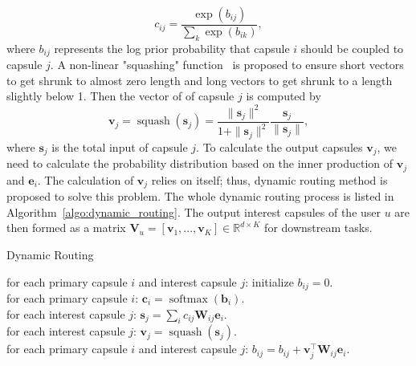 \begin{equation}
    c_{ij}=\frac{\exp(b_{ij})}{\sum_k \exp(b_{ik})},
\end{equation}
where $b_{ij}$ represents the log prior probability that capsule $i$ should be coupled to capsule $j$. A non-linear "squashing" function~\cite{sabour2017dynamic} is proposed to ensure short vectors to get shrunk to almost zero length and long vectors to get shrunk to a length slightly below 1. Then the vector of of capsule $j$ is computed by
\begin{equation}
    \label{eqn:squash}
    \mathbf{v}_j = \operatorname{squash}(\mathbf{s}_j) =  \frac{\|\mathbf{s}_j\|^2}{1+\|\mathbf{s}_j\|^2} \frac{\mathbf{s}_j}{\|\mathbf{s}_j\|},
\end{equation}
where $\mathbf{s}_j$ is the total input of capsule $j$. To calculate the output capsules $\mathbf{v}_j$, we need to calculate the probability distribution based on the inner production of $\mathbf{v}_j$ and $\mathbf{e}_i$. The calculation of $\mathbf{v}_j$ relies on itself; thus, dynamic routing method is proposed to solve this problem. The whole dynamic routing process is listed in Algorithm~\ref{algo:dynamic_routing}. The output interest capsules of the user $u$ are then formed as a matrix $\mathbf{V}_u=[\mathbf{v}_1, ..., \mathbf{v}_K] \in \mathbb{R}^{d\times K}$ for downstream tasks.



\begin{algorithm}[t]
	\caption{Dynamic Routing \label{algo:dynamic_routing}}
	for each primary capsule $i$ and interest capsule $j$: initialize $b_{ij} = 0$. \\
     {
        for each primary capsule $i$: $\mathbf{c}_i = \operatorname{softmax}(\mathbf{b}_{i})$.\\
        for each interest capsule $j$: $\mathbf{s}_j = \sum_{i} c_{ij}\mathbf{W}_{ij}\mathbf{e}_i$.\\%

        for each interest capsule $j$: $\mathbf{v}_j = \operatorname{squash}(\mathbf{s}_j)$. \\

        for each primary capsule $i$ and interest capsule $j$: $b_{ij} = b_{ij}+ \mathbf{v}_j^\top \mathbf{W}_{ij}\mathbf{e}_i$.
    }
\end{algorithm}


